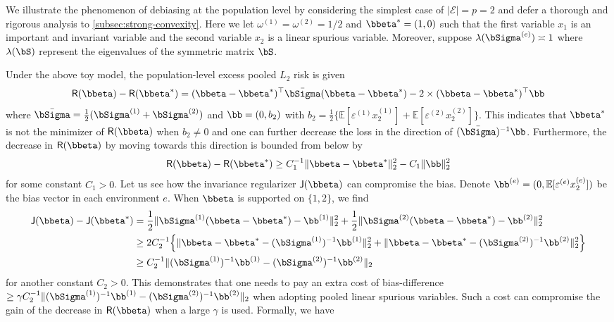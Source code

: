 \documentclass[10pt]{article}
\numberwithin{equation}{section}
\begin{document}
We illustrate the phenomenon of debiasing at the population level by considering the simplest case of $|\mathcal{E}|=p=2$ and defer a thorough and rigorous analysis to \cref{subsec:strong-convexity}. Here we let $\omega^{(1)}=\omega^{(2)}=1/2$ and $\bbeta^*=(1,0)$ such that the first variable $x_1$ is an important and invariant variable and the second variable $x_2$ is a linear spurious variable. Moreover, suppose $\lambda(\bSigma^{(e)}) \asymp 1$ where $\lambda(\bS)$ represent the eigenvalues of the symmetric matrix $\bS$. 


Under the above toy model, the population-level excess pooled $L_2$ risk is given 
\begin{align*}
    \mathsf{R}(\bbeta) - \mathsf{R}(\bbeta^*) = (\bbeta - \bbeta^*)^\top \bar{\bSigma} (\bbeta - \bbeta^*) - 2\times (\bbeta - \bbeta^*)^\top \bb
\end{align*} 
where $\bar{\bSigma} = \frac{1}{2} (\bSigma^{(1)} + \bSigma^{(2)})$ and  $\bb = (0, b_2)$ with  $b_2 = \frac{1}{2} \{\mathbb{E}[\varepsilon^{(1)} x_2^{(1)}] + \mathbb{E}[\varepsilon^{(2)} x_2^{(2)}]\}$.
This indicates that $\bbeta^*$ is not the minimizer of $\mathsf{R}(\bbeta)$ when $b_2 \not = 0$
and one can further decrease the loss in the direction of $(\bar{\bSigma})^{-1} \bb$. Furthermore, the  decrease in $\mathsf{R}(\bbeta)$ by moving towards this direction is  bounded from below by
\begin{align*}
    \mathsf{R}(\bbeta) - \mathsf{R}(\bbeta^*) \ge C_1^{-1} \|\bbeta - \bbeta^*\|_2^2 - C_1 \|\bb\|_2^2
\end{align*} for some constant $C_1>0$. Let us see how the invariance regularizer $\mathsf{J}(\bbeta)$ can compromise the bias. Denote $\bb^{(e)}=(0,\mathbb{E}[\varepsilon^{(e)} x_2^{(e)}])$ be the bias vector in each environment $e$. When $\bbeta$ is supported on $\{1,2\}$, we find
\begin{align*}
    \mathsf{J}(\bbeta) - \mathsf{J}(\bbeta^*) &= \frac{1}{2} \|\bSigma^{(1)} (\bbeta - \bbeta^*) - \bb^{(1)} \|_2^2 + \frac{1}{2} \|\bSigma^{(2)} (\bbeta - \bbeta^*) - \bb^{(2)} \|_2^2 \\
    & \ge 2 C_2^{-1} \Big \{\| \bbeta - \bbeta^* - (\bSigma^{(1)})^{-1} \bb^{(1)} \|_2^2 +  \|\bbeta - \bbeta^* - (\bSigma^{(2)})^{-1}\bb^{(2)} \|_2^2 \Big \}\\
    &\ge C_2^{-1} \|(\bSigma^{(1)})^{-1} \bb^{(1)} - (\bSigma^{(2)})^{-1} \bb^{(2)}\|_2
\end{align*} for another constant $C_2>0$. This demonstrates that one needs to pay an extra cost of bias-difference $\geq \gamma C_2^{-1}\|(\bSigma^{(1)})^{-1} \bb^{(1)} - (\bSigma^{(2)})^{-1} \bb^{(2)}\|_2$ when adopting pooled linear spurious variables. Such a cost can compromise the gain of the decrease in $\mathsf{R}(\bbeta)$ when a large $\gamma$ is used. Formally, we have
\end{document}
